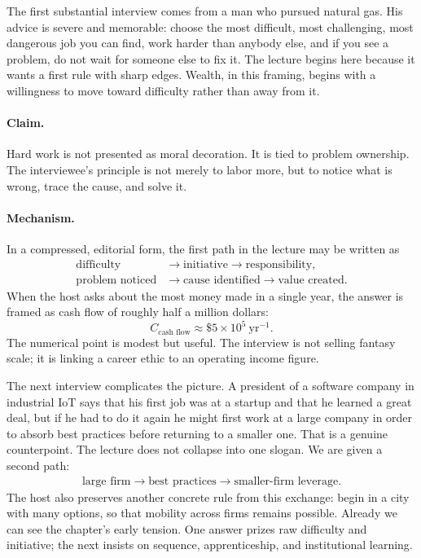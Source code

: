 The first substantial interview comes from a man who pursued natural gas. His advice is severe and memorable: choose the most difficult, most challenging, most dangerous job you can find, work harder than anybody else, and if you see a problem, do not wait for someone else to fix it. The lecture begins here because it wants a first rule with sharp edges. Wealth, in this framing, begins with a willingness to move toward difficulty rather than away from it.

\paragraph{Claim.}
Hard work is not presented as moral decoration. It is tied to problem ownership. The interviewee's principle is not merely to labor more, but to notice what is wrong, trace the cause, and solve it.

\paragraph{Mechanism.}
In a compressed, editorial form, the first path in the lecture may be written as
\begin{align}
\text{difficulty} &\longrightarrow \text{initiative} \longrightarrow \text{responsibility}, \\
\text{problem noticed} &\longrightarrow \text{cause identified} \longrightarrow \text{value created}.
\end{align}
When the host asks about the most money made in a single year, the answer is framed as cash flow of roughly half a million dollars:
\begin{equation}
C_{\text{cash flow}} \approx \$5\times 10^{5}\ \text{yr}^{-1}.
\end{equation}
The numerical point is modest but useful. The interview is not selling fantasy scale; it is linking a career ethic to an operating income figure.

The next interview complicates the picture. A president of a software company in industrial IoT says that his first job was at a startup and that he learned a great deal, but if he had to do it again he might first work at a large company in order to absorb best practices before returning to a smaller one. That is a genuine counterpoint. The lecture does not collapse into one slogan. We are given a second path:
\begin{align}
\text{large firm} \longrightarrow \text{best practices} \longrightarrow \text{smaller-firm leverage}.
\end{align}
The host also preserves another concrete rule from this exchange: begin in a city with many options, so that mobility across firms remains possible. Already we can see the chapter's early tension. One answer prizes raw difficulty and initiative; the next insists on sequence, apprenticeship, and institutional learning.

